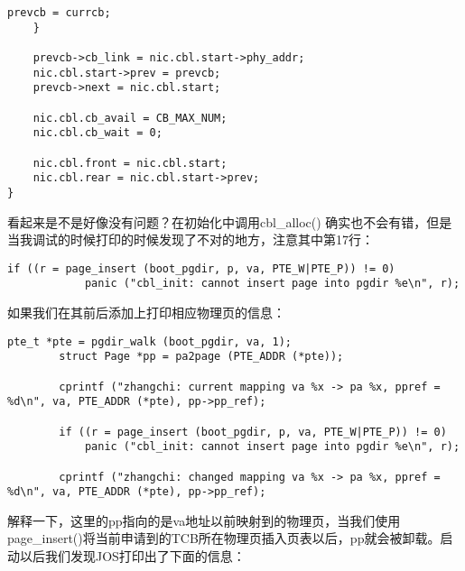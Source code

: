 \documentclass{article}
\newcommand{\funcname}[1]{{\ttfamily \small #1}}
\begin{document}
\begin{CJK*}{UTF8}{gkai}
\begin{lstlisting}[style=ccode, title={\scriptsize \ttfamily \bfseries kern/e100.c: cbl\_alloc()}]
        prevcb = currcb;
    }

    prevcb->cb_link = nic.cbl.start->phy_addr;
    nic.cbl.start->prev = prevcb;
    prevcb->next = nic.cbl.start;

    nic.cbl.cb_avail = CB_MAX_NUM;
    nic.cbl.cb_wait = 0;

    nic.cbl.front = nic.cbl.start;
    nic.cbl.rear = nic.cbl.start->prev;
}
\end{lstlisting}


看起来是不是好像没有问题？在初始化中调用\funcname{cbl\_alloc()} 确实也不会有错，但是当我调试的时候打印的时候发现了不对的地方，注意其中第17行：

\begin{lstlisting}[style=ccode, firstnumber=17]
        if ((r = page_insert (boot_pgdir, p, va, PTE_W|PTE_P)) != 0)
            panic ("cbl_init: cannot insert page into pgdir %e\n", r);
\end{lstlisting}

如果我们在其前后添加上打印相应物理页的信息：

\begin{lstlisting}[style=ccode, title={\scriptsize \ttfamily \bfseries kern/e100.c: cbl\_alloc()}]
        pte_t *pte = pgdir_walk (boot_pgdir, va, 1);
        struct Page *pp = pa2page (PTE_ADDR (*pte));

        cprintf ("zhangchi: current mapping va %x -> pa %x, ppref = %d\n", va, PTE_ADDR (*pte), pp->pp_ref);

        if ((r = page_insert (boot_pgdir, p, va, PTE_W|PTE_P)) != 0)
            panic ("cbl_init: cannot insert page into pgdir %e\n", r);

        cprintf ("zhangchi: changed mapping va %x -> pa %x, ppref = %d\n", va, PTE_ADDR (*pte), pp->pp_ref);
\end{lstlisting}

解释一下，这里的pp指向的是va地址以前映射到的物理页，当我们使用\funcname{page\_insert()}将当前申请到的TCB所在物理页插入页表以后，pp就会被卸载。启动以后我们发现JOS打印出了下面的信息：


\end{CJK*}
\end{document}

